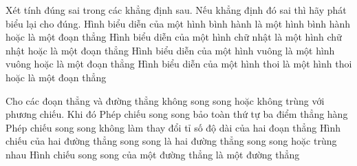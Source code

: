 \begin{ex}%
 Xét tính đúng sai  trong các khẳng định sau. Nếu khẳng định đó sai thì hãy phát biểu lại cho đúng.
 \choiceTF 
  {\True Hình biểu diễn của một  hình bình hành là một hình bình hành hoặc là một đoạn thẳng}
  {Hình biểu diễn của một hình chữ nhật là  một hình chữ nhật hoặc là một đoạn thẳng}
  {Hình biểu diễn của một hình vuông là một hình vuông hoặc  là một đoạn thẳng}
  {Hình biểu diễn của một hình thoi là một hình thoi hoặc là một đoạn  thẳng}
\end{ex}

\begin{ex}%
 Cho các đoạn thẳng  và đường thẳng không song song hoặc không trùng với phương chiếu. Khi đó
 \choiceTF 
  {\True Phép chiếu song song bảo toàn thứ tự ba  điểm thẳng hàng}
   {Phép chiếu song song không làm thay đổi tỉ số độ dài của hai đoạn thẳng}
   {\True Hình chiếu của hai đường thẳng song song là hai đường thẳng song song hoặc trùng nhau}
  {\True  Hình chiếu song song của một đường thẳng là một đường thẳng}
\end{ex}

